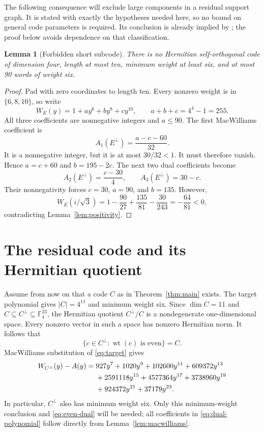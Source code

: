 \documentclass[11pt]{article}
\newtheorem{lemma}[theorem]{Lemma}
\theoremstyle{remark}
\newcommand{\F}{\mathbb F_4}
\newcommand{\wt}{\operatorname{wt}}
\begin{document}
The following consequence will exclude large components in a residual
support graph.  It is stated with exactly the hypotheses needed here, so
no bound on general code parameters is required.  Its conclusion is
already implied by \cite[Table 2]{BO}; the proof below avoids dependence
on that classification.

\begin{lemma}[Forbidden short subcode]\label{lem:short-code}
There is no Hermitian self-orthogonal code of dimension four, length at
most ten, minimum weight at least six, and at most 90 words of weight six.
\end{lemma}

\begin{proof}
Pad with zero coordinates to length ten.  Every nonzero weight is in
$\{6,8,10\}$, so write
\[
 W_E(y)=1+a y^6+b y^8+c y^{10},\qquad a+b+c=4^4-1=255.
\]
All three coefficients are nonnegative integers and $a\leq90$.
The first MacWilliams coefficient is
\[
 A_1(E^\perp)=\frac{a-c-60}{32}.
\]
It is a nonnegative integer, but it is at most $30/32<1$.
It must therefore vanish.  Hence $a=c+60$ and $b=195-2c$.
The next two dual coefficients become
\[
 A_2(E^\perp)=\frac{c-30}{4},\qquad
 A_3(E^\perp)=30-c.
\]
Their nonnegativity forces $c=30$, $a=90$, and $b=135$.
However,
\[
 W_E(i/\sqrt3)=1-\frac{90}{27}+\frac{135}{81}
                   -\frac{30}{243}=-\frac{64}{81}<0,
\]
contradicting Lemma~\ref{lem:positivity}.
\end{proof}

\section{The residual code and its Hermitian quotient}

Assume from now on that a code $C$ as in Theorem~\ref{thm:main} exists.
The target polynomial gives $|C|=4^{11}$ and minimum weight six.
Since $\dim C=11$ and $C\subseteq C^\perp\subseteq\F^{23}$,
the Hermitian quotient $C^\perp/C$ is a nondegenerate one-dimensional
space.  Every nonzero vector in such a space has nonzero Hermitian norm.
It follows that
\begin{equation}
 \{c\in C^\perp:\wt(c)\text{ is even}\}=C.
 \label{eq:even-dual}
\end{equation}
MacWilliams substitution of \eqref{eq:target} gives
\begin{align}
 W_{C^\perp}(y)-A(y)={}&927y^7+1020y^9+102600y^{11}
          +609372y^{13}\notag\\
       &+2591118y^{15}+4577364y^{17}+3738960y^{19}\notag\\
       &+924372y^{21}+37179y^{23}.
 \label{eq:dual-polynomial}
\end{align}
In particular, $C^\perp$ also has minimum weight six.
Only this minimum-weight conclusion and \eqref{eq:even-dual} will be
needed; all coefficients in \eqref{eq:dual-polynomial} follow directly
from Lemma~\ref{lem:macwilliams}.
\end{document}
